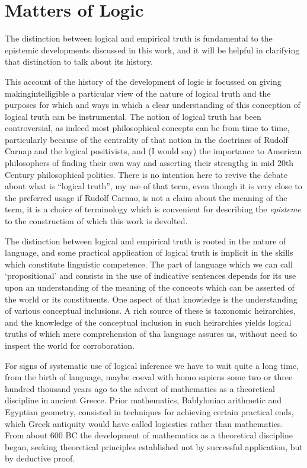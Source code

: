 \documentclass[10pt,titlepage]{article}
\begin{document}
\section{Matters of Logic}

The distinction between logical and empirical truth is fundamental to the epistemic developments discussed in this work, and it will be helpful in clarifying that distinction to talk about its history.

This account of the history of the development of logic is focussed on giving makingintelligible a particular view of the nature of logical truth and the purposes for which and ways in which a clear understanding of this conception of logical truth can be instrumental.
The notion of logical truth has been controversial, as indeed most philosophical concepts can be from time to time, particularly because of the centrality of that notion in the doctrines of Rudolf Carnap and the logical positivists, and (I would say) the importance to American philosophers of finding their own way and asserting their strengthg in mid 20th Century philosophical politics.
There is no intention here to revive the debate about what is ``logical truth'', my use of that term, even though it is very close to the preferred usage if Rudolf Carnao, is not a claim about the meaning of the term, it is a choice of terminology which is convenient for describing the \emph{episteme} to the construction of which this work is devolted.

The distinction between logical and empirical truth is rooted in the nature of language, and some practical application of logical truth is implicit in the skills which constitute linguistic competence.
The part of language which we can call `propositional' and consists in the use of indicative sentences depends for its use upon an understanding of the meaning of the conceots which can be asserted of the world or its constituents.
One aspect of that knowledge is the understanding of various conceptual inclusions.
A rich source of these is taxonomic heirarchies, and the knowledge of the conceptual inclusion in such heirarchies yields logical truths of which mere comprehension of tha language assures us, without need to inspect the world for corroboration.

For signs of systematic use of logical inference we have to wait quite a long time, from the birth of language, maybe coeval with homo sapiens some two or three hundred thousand years ago to the advent of mathematics as a theoretical discipline in ancient Greece.
Prior mathematics, Bablylonian arithmetic and Egyptian geometry, consisted in techniques for achieving certain practical ends, which Greek antiquity would have called logicstics rather than mathematics.
From about 600 BC the development of mathematics as a theoretical discipline began, seeking theoretical principles established not by successful application, but by deductive proof.
\end{document}
